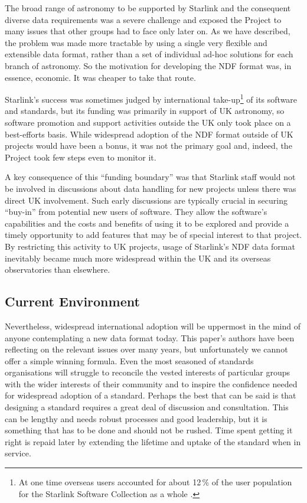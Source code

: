 \documentclass[final,authoryear,5p,times,twocolumn]{elsarticle}
\begin{document}
The broad range of astronomy to be supported by Starlink and the
consequent diverse data requirements was a severe challenge and
exposed the Project to many issues that other groups had to face only
later on. As we have described, the problem was made more tractable by
using a single very flexible and extensible data format, rather than a
set of individual ad-hoc solutions for each branch of astronomy. So
the motivation for developing the NDF format was, in essence,
economic. It was cheaper to take that route.

Starlink's success was sometimes judged by international
take-up\footnote{At one time overseas users accounted for about
 12\,\% of the user population for the Starlink Software Collection
 as a whole \citep{1992STARB..10...30L}.} of its
software and standards, but its funding was primarily in support of UK
astronomy, so software promotion and support activities outside the UK
only took place on a best-efforts basis. While widespread adoption of
the NDF format outside of UK projects would have been a bonus, it was
not the primary goal and, indeed, the Project took few steps even to
monitor it.

A key consequence of this ``funding boundary'' was that Starlink staff
would not be involved in discussions about data handling for new
projects unless there was direct UK involvement. Such early
discussions are typically crucial in securing ``buy-in'' from potential
new users of software. They allow the software's capabilities and the
costs and benefits of using it to be explored and provide a timely
opportunity to add features that may be of special interest to that
project. By restricting this activity to UK projects, usage of
Starlink's NDF data format inevitably became much more widespread
within the UK and its overseas observatories than elsewhere.

\subsection{Current Environment}

Nevertheless, widespread international adoption will be uppermost in
the mind of anyone contemplating a new data format today. This paper's
authors have been reflecting on the relevant issues over many years,
but unfortunately we cannot offer a simple winning formula. Even the
most seasoned of standards organisations will struggle to reconcile
the vested interests of particular groups with the wider interests of
their community and to inspire the confidence needed for widespread
adoption of a standard. Perhaps the best that can be said is that
designing a standard requires a great deal of discussion and
consultation. This can be lengthy and needs robust processes and good
leadership, but it is something that has to be done and should not be
rushed. Time spent getting it right is repaid later by extending the
lifetime and uptake of the standard when in service.
\end{document}
